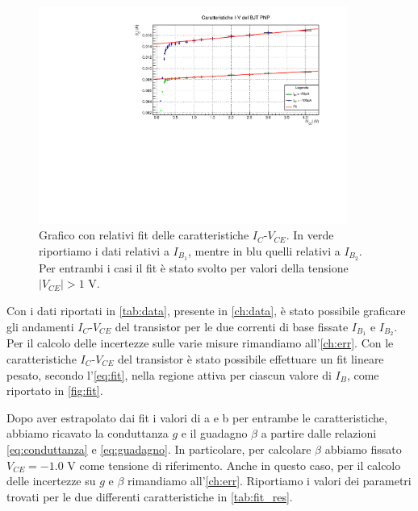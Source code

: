 \begin{figure}[b!]
    \centering
    \includegraphics[width=0.9\textwidth]{image/fit.pdf}
    \caption{Grafico con relativi fit delle  caratteristiche $I_C$-$V_{CE}$. In verde riportiamo i dati relativi a $I_{B_1}$, mentre in blu quelli relativi a $I_{B_2}$. Per entrambi i casi il fit è stato svolto per valori della tensione $|V_{CE}|>1$ \si{V}.}
    \label{fig:fit}
\end{figure}

Con i dati riportati in \autoref{tab:data}, presente in \autoref{ch:data}, è stato possibile graficare gli andamenti $I_C$-$V_{CE}$ del transistor per le due correnti di base fissate $I_{B_1}$ e $I_{B_2}$. Per il calcolo delle incertezze sulle varie misure rimandiamo all’\autoref{ch:err}. Con le caratteristiche $I_C$-$V_{CE}$ del transistor è stato possibile effettuare un fit lineare pesato, secondo l'\autoref{eq:fit}, nella regione attiva per ciascun valore di $I_B$, come riportato in \autoref{fig:fit}.

Dopo aver estrapolato dai fit i valori di a e b per entrambe le caratteristiche, abbiamo ricavato la conduttanza $g$ e il guadagno $\beta$ a partire dalle relazioni \eqref{eq:conduttanza} e \eqref{eq:guadagno}. In particolare, per calcolare $\beta$ abbiamo fissato $V_{CE} = -1.0$ \si{V} come tensione di riferimento. Anche in questo caso, per il calcolo delle incertezze su $g$ e $\beta$ rimandiamo all’\autoref{ch:err}.  
Riportiamo i valori dei parametri trovati per le due differenti caratteristiche in \autoref{tab:fit_res}.

